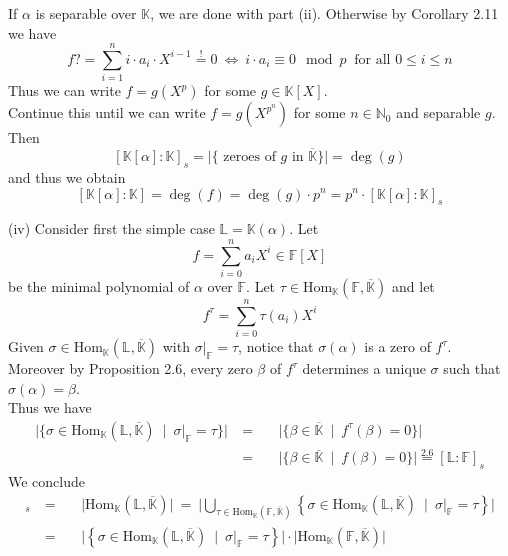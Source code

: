 \documentclass[12pt]{book}
\begin{document}
\begin{spacing}{1.3}
\begin{compactenum}
If $\alpha$ is separable over $\mathbb{K}$, we are done with part (ii). Otherwise by Corollary 2.11 we have
$$f?=\sum_{i=1}^n i \cdot a_i \cdot X^{i-1}\overset{!}{=} 0 \ \Longleftrightarrow \ i \cdot a_i \equiv 0 \mod p \ \textrm{ for all } 0 \leqslant i \leqslant n $$
Thus we can write $f=g(X^p)$ for some $g \in \mathbb{K}[X]$.\\
Continue this until we can write $f=g(X^{p^n})$ for some $n \in \mathbb{N}_0$ and separable $g$. Then 
$$[\mathbb{K}[\alpha]:\mathbb{K}]_s=\vert \{ \textrm{ zeroes of }g \textrm{ in } \overline{\mathbb{K}} \} \vert =\deg(g)$$
and thus we obtain
$$[\mathbb{K}[\alpha]:\mathbb{K}]=\deg(f)=\deg(g) \cdot p^n =p^n \cdot [\mathbb{K}[\alpha]:\mathbb{K}]_s$$
\item[(iv)] Consider first the simple case $\mathbb{L}=\mathbb{K}(\alpha)$. Let
$$f=\sum_{i=0}^n a_i X^{i} \in\mathbb{F}[X]$$
be the minimal polynomial of $\alpha$ over $\mathbb{F}$. Let $\tau \in \textrm{Hom}_{\mathbb{K}}(\mathbb{F}, \overline{\mathbb{K}})$ and let
$$f^{\tau}=\sum_{i=0}^n \tau(a_i) X^{i}$$
Given $\sigma \in \textrm{Hom}_{\mathbb{K}}(\mathbb{L}, \overline{\mathbb{K}})$ with $\sigma |_{\mathbb{F}}=\tau$, notice that $\sigma(\alpha)$ is a zero of $f^{\tau}$. Moreover by Proposition 2.6, every zero $\beta$ of $f^{\tau}$ determines a unique $\sigma$ such that $\sigma(\alpha)=\beta$. \\
Thus we have
\begin{alignat*}{5}
\big\vert \{ \sigma \in \textrm{Hom}_{\mathbb{K}}(\mathbb{L}, \overline{\mathbb{K}}) \ \mid\ \sigma|_{\mathbb{F}}=\tau \} \big \vert \ &=&& \ \big \vert \{ \beta \in \overline{\mathbb{K}} \ \mid\ f^{\tau}(\beta)=0 \} \big\vert \\
&=&& \ \big\vert \{\beta \in \overline{\mathbb{K}} \ \mid \ f(\beta)=0 \} \big\vert \overset{2.6}{=} [\mathbb{L}:\mathbb{F}]_s
\end{alignat*}
We conclude
\begin{alignat*}{5}
[\mathbb{L}:\mathbb{K}]_s \ &=&& \ \big\vert \textrm{Hom}_{\mathbb{K}}(\mathbb{L}, \overline{\mathbb{K}}) \big\vert \ = \ \Big\vert \bigcup_{\tau \in \textrm{Hom}_{\mathbb{K}}(\mathbb{F}, \overline{\mathbb{K}})} \left\{ \sigma \in \textrm{Hom}_{\mathbb{K}}(\mathbb{L}, \overline{\mathbb{K}}) \ \mid \ \sigma|_{\mathbb{F}}=\tau \right\} \Big\vert \\
&=&& \ \big\vert \left\{ \sigma \in \textrm{Hom}_{\mathbb{K}}(\mathbb{L}, \overline{\mathbb{K}}) \ \mid \ \sigma|_{\mathbb{F}}=\tau \right\} \big\vert \cdot \big\vert \textrm{Hom}_{\mathbb{K}}(\mathbb{F}, \overline{\mathbb{K}}) \big\vert\\ 

\end{alignat*}
\end{compactenum}
\end{spacing}
\end{document}
